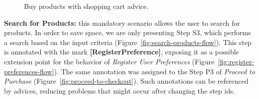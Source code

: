 \documentclass{acm_proc_article-sp}
\begin{document}
\begin{figure}[h]
\caption{Buy products with shopping cart advice.}
\label{fig:buy-product-changing-flow}
\end{figure}

{\bf Search for Products:} this mandatory scenario allows the user to search for
products. In order to save space, we are only presenting Step S3, which performs
a search based on the input criteria (Figure~\ref{fig:search-products-flow}).
This step is annotated with the mark \mbox{{\bf [RegisterPreference]}}, exposing
it as a possible extension point for the behavior of \emph{Register User
Preferences} (Figure~\ref{fig:register-preferences-flow}). The same annotation
was assigned to the Step P3 of \emph{Proceed to Purchase}
(Figure~\ref{fig:proceed-to-checkout}). Such annotations can be referenced by advices, reducing problems
that might occur after changing the step ids.
\end{document}
